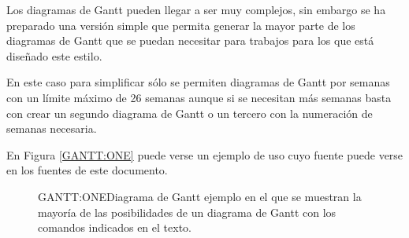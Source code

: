 Los diagramas de Gantt pueden llegar a ser muy complejos, sin embargo se ha preparado una versión simple que permita generar la mayor parte de los diagramas de Gantt que se puedan necesitar para trabajos para los que está diseñado este estilo.

En este caso para simplificar sólo se permiten diagramas de Gantt por semanas con un límite máximo de 26 semanas aunque si se necesitan más semanas basta con crear un segundo diagrama de Gantt o un tercero con la numeración de semanas necesaria.

En Figura \ref{GANTT:ONE} puede verse un ejemplo de uso cuyo fuente puede verse en los fuentes de este documento.

\begin{figure}[Ejemplo de diagrama de Gantt]{GANTT:ONE}{Diagrama de Gantt ejemplo en el que se muestran la mayoría de las posibilidades de un diagrama de Gantt con los comandos indicados en el texto.}
\begin{gantt}{1}{26}
   \\
   \\
   \\
   \\
   \\
   \\
  \\
   \\
   \\
   \\
   \\
   \\
   \\
   \\
   \\
   \\
   \\
   \\
\end{gantt}
\end{figure}

